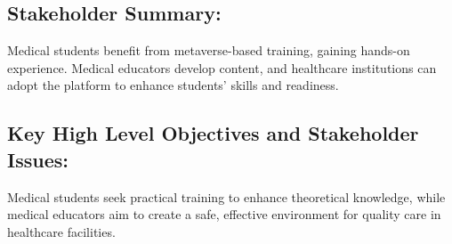 \subsection{Stakeholder Summary:}
Medical students benefit from metaverse-based training, gaining hands-on experience. Medical educators develop content, and healthcare institutions can adopt the platform to enhance students' skills and readiness.
\subsection{Key High Level Objectives and Stakeholder Issues:}
Medical students seek practical training to enhance theoretical knowledge, while medical educators aim to create a safe, effective environment for quality care in healthcare facilities.